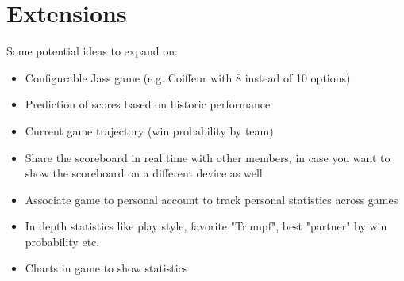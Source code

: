 \section*{Extensions}
Some potential ideas to expand on:
\begin{itemize}
    \item Configurable Jass game (e.g. Coiffeur with 8 instead of 10 options)
    \item Prediction of scores based on historic performance
    \item Current game trajectory (win probability by team)
    \item Share the scoreboard in real time with other members, in case you want to show the scoreboard on a different device as well
    \item Associate game to personal account to track personal statistics across games
    \item In depth statistics like play style, favorite "Trumpf", best "partner" by win probability etc.
    \item Charts in game to show statistics
\end{itemize}
